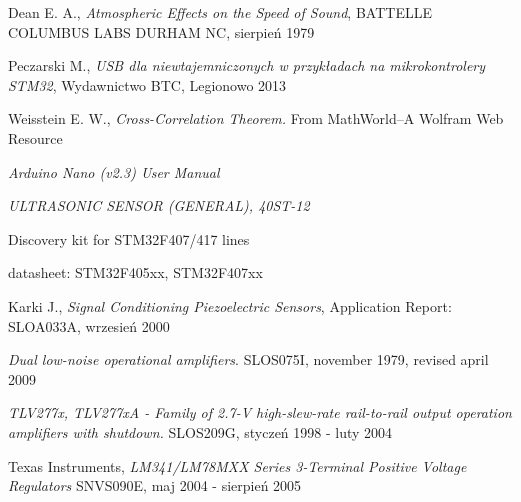 \begin{thebibliography}{99}


    Dean E. A., \textit{Atmospheric Effects on the Speed of Sound}, 
  BATTELLE COLUMBUS LABS DURHAM NC, sierpień 1979

   Peczarski M., 
  \textit{USB dla niewtajemniczonych w przykładach na mikrokontrolery STM32}, Wydawnictwo BTC, Legionowo 2013

   Weisstein E. W., 
  \textit{Cross-Correlation Theorem.} From MathWorld--A Wolfram Web Resource 

  \textit{Arduino Nano (v2.3) User Manual}
  
  \textit{ULTRASONIC SENSOR (GENERAL), 40ST-12}

   Discovery kit for STM32F407/417 lines

   datasheet: STM32F405xx, STM32F407xx 
  
   Karki J., \textit{Signal Conditioning Piezoelectric Sensors}, 
  Application Report: SLOA033A, wrzesień 2000

   \textit{Dual low-noise operational amplifiers}. SLOS075I, november 1979, revised april 2009

   \textit{TLV277x, TLV277xA - Family of 2.7-V high-slew-rate rail-to-rail output operation amplifiers with shutdown.}
  SLOS209G, styczeń 1998 - luty 2004
  
   Texas Instruments, \textit{LM341/LM78MXX Series 3-Terminal Positive Voltage Regulators}
  SNVS090E, maj 2004 - sierpień 2005
  


\end{thebibliography}
